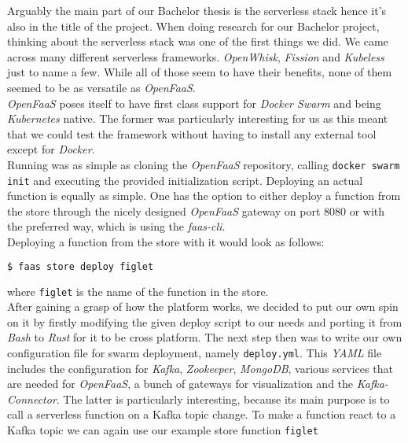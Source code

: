\documentclass{article}
\begin{document}
  Arguably the main part of our Bachelor thesis is the serverless stack hence it's also in the title of the project. When doing research for our Bachelor project, thinking about the serverless stack was one of the first things we did. We came across many different serverless frameworks. \textit{OpenWhisk}, \textit{Fission} and \textit{Kubeless} just to name a few. While all of those seem to have their benefits, none of them seemed to be as versatile as \textit{OpenFaaS}. \\
  \textit{OpenFaaS} poses itself to have first class support for \textit{Docker Swarm} and being \textit{Kubernetes} native. The former was particularly interesting for us as this meant that we could test the framework without having to install any external tool except for  \textit{Docker}. \\
  Running was as simple as cloning the \textit{OpenFaaS} repository, calling \texttt{docker swarm init} and executing the provided initialization script. Deploying an actual function is equally as simple. One has the option to either deploy a function from the store through the nicely designed  \textit{OpenFaaS} gateway on port 8080 or with the preferred way, which is using the \textit{faas-cli}. \\

  Deploying a function from the store with it would look as follows:

  \begin{lstlisting}[language=bash]
    $ faas store deploy figlet
  \end{lstlisting}

  where \texttt{figlet} is the name of the function in the store.\\

  After gaining a grasp of how the platform works, we decided to put our own spin on it by firstly modifying the given deploy script to our needs and porting it from \textit{Bash} to \textit{Rust} for it to be cross platform. The next step then was to write our own configuration file for swarm deployment, namely \texttt{deploy.yml}. This \textit{YAML} file includes the configuration for \textit{Kafka}, \textit{Zookeeper}, \textit{MongoDB}, various services that are needed for \textit{OpenFaaS}, a bunch of gateways for visualization and the \textit{Kafka-Connector}. The latter is particularly interesting, because its main purpose is to call a serverless function on a Kafka topic change. To make a function react to a Kafka topic we can again use our example store function \texttt{figlet}
\end{document}
